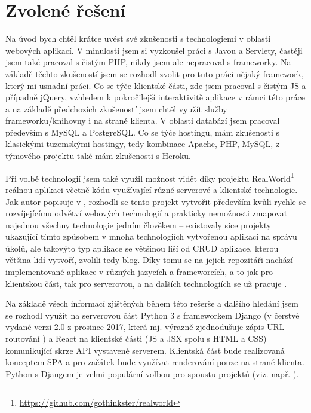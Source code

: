     \section{Zvolené řešení}\label{reseni}
    Na úvod bych chtěl krátce uvést své zkušenosti s technologiemi v oblasti webových aplikací. V minulosti jsem si vyzkoušel práci s Javou a Servlety, častěji jsem také pracoval s čistým PHP, nikdy jsem ale nepracoval s frameworky. Na základě těchto zkušeností jsem se rozhodl zvolit pro tuto práci nějaký framework, který mi usnadní práci. Co se týče klientské části, zde jsem pracoval s čistým JS a případně jQuery, vzhledem k pokročilejší interaktivitě aplikace v rámci této práce a na základě předchozích zkušeností jsem chtěl využít služby frameworku/knihovny i na straně klienta. V oblasti databází jsem pracoval především s MySQL a PostgreSQL. Co se týče hostingů, mám zkušenosti s klasickými tuzemskými hostingy, tedy kombinace Apache, PHP, MySQL, z týmového projektu také mám zkušenosti s Heroku.
    
    Při volbě technologií jsem také využil možnost vidět díky projektu RealWorld\footnote{\url{https://github.com/gothinkster/realworld}} reálnou aplikaci včetně kódu využívající různé serverové a klientské technologie. Jak autor popisuje v \cite{realworld}, rozhodli se tento projekt vytvořit především kvůli rychle se rozvíjejícímu odvětví webových technologií a prakticky nemožnosti zmapovat najednou všechny technologie jedním člověkem -- existovaly sice projekty ukazující tímto způsobem v mnoha technologiích vytvořenou aplikaci na správu úkolů, ale takovýto typ aplikace se většinou liší od CRUD aplikace, kterou většina lidí vytvoří, zvolili tedy blog. Díky tomu se na jejich repozitáři nachází implementované aplikace v různých jazycích a frameworcích, a to jak pro klientskou část, tak pro serverovou, a na dalších technologiích se už pracuje \cite{realworld-git}.
    
    Na základě všech informací zjištěných během této rešerše a dalšího hledání jsem se rozhodl využít na serverovou část Python 3 s frameworkem Django (v čerstvě vydané verzi 2.0 z prosince 2017, která mj. výrazně zjednodušuje zápis URL routování \cite{django2}) a React na klientské části (JS a JSX spolu s HTML a CSS) komunikující skrze API vystavené serverem. Klientská část bude realizovaná konceptem SPA a pro začátek bude využívat renderování pouze na straně klienta. Python s Djangem je velmi populární volbou pro spoustu projektů (viz. např. \cite{stack-stats18}).
    
